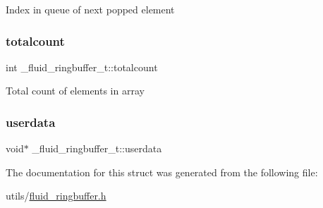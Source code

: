 Index in queue of next popped element \mbox{\label{struct__fluid__ringbuffer__t_a3f705c52b05143c4b280a6b97b5786cb}} 
\subsubsection{\texorpdfstring{totalcount}{totalcount}}
{\footnotesize\ttfamily int \+\_\+fluid\+\_\+ringbuffer\+\_\+t\+::totalcount}

Total count of elements in array \mbox{\label{struct__fluid__ringbuffer__t_a6f77ab4788fa1cefa502a70e77b27ac1}} 
\subsubsection{\texorpdfstring{userdata}{userdata}}
{\footnotesize\ttfamily void$\ast$ \+\_\+fluid\+\_\+ringbuffer\+\_\+t\+::userdata}



The documentation for this struct was generated from the following file\+:\begin{DoxyCompactItemize}
\item 
utils/\hyperlink{fluid__ringbuffer_8h}{fluid\+\_\+ringbuffer.\+h}\end{DoxyCompactItemize}

